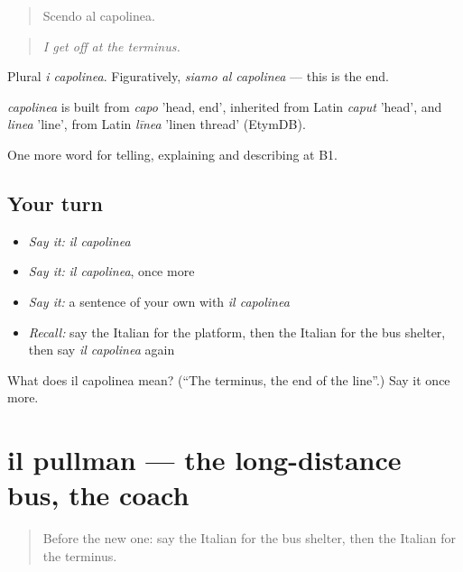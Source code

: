 \begin{quote}
Scendo al capolinea.
\end{quote}

\begin{quote}
\emph{I get off at the terminus.}
\end{quote}

Plural \emph{i capolinea}. Figuratively, \emph{siamo al capolinea} — this is the end.

\begin{cousinweb}
\emph{capolinea} is built from \emph{capo} 'head, end', inherited from Latin \emph{caput} 'head', and \emph{linea} 'line', from Latin \emph{līnea} 'linen thread' (EtymDB).
\end{cousinweb}

\begin{grammarlens}[title={What you've built}]
One more word for telling, explaining and describing at B1.
\end{grammarlens}

\subsection*{Your turn}
\begin{itemize}
\raggedright
  \item \emph{Say it:} \emph{il capolinea}
  \item \emph{Say it:} \emph{il capolinea}, once more
  \item \emph{Say it:} a sentence of your own with \emph{il capolinea}
  \item \emph{Recall:} say the Italian for the platform, then the Italian for the bus shelter, then say \emph{il capolinea} again
\end{itemize}

\begin{tcolorbox}[breakable,colback=teal!4,colframe=teal!35!black,title={Before you move on}]
What does il capolinea mean? (\textquotedblleft{}The terminus, the end of the line\textquotedblright{}.) Say it once more.
\end{tcolorbox}
\section[il pullman]{il pullman — the long-distance bus, the coach}

\label{lesson:IT-C417-pullman}



\begin{quote}
Before the new one: say the Italian for the bus shelter, then the Italian for the terminus.
\end{quote}


